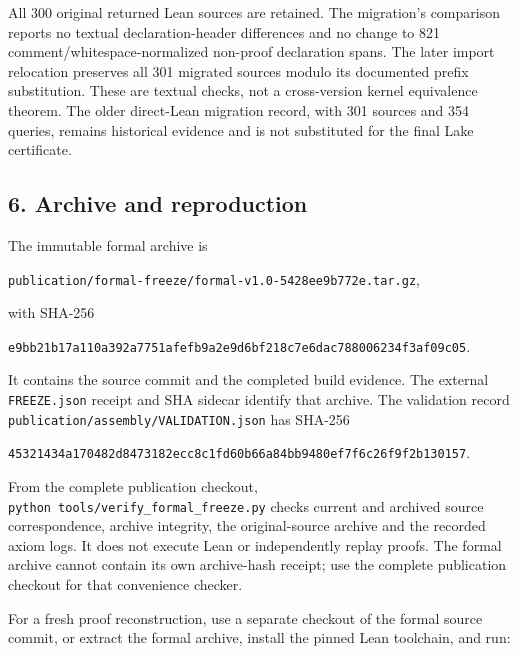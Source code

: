 \documentclass[english,11pt,a4paper]{article}
\begin{document}
All 300 original returned Lean sources are retained. The migration's comparison reports no textual declaration-header differences and no change to 821 comment/whitespace-normalized non-proof declaration spans. The later import relocation preserves all 301 migrated sources modulo its documented prefix substitution. These are textual checks, not a cross-version kernel equivalence theorem. The older direct-Lean migration record, with 301 sources and 354 queries, remains historical evidence and is not substituted for the final Lake certificate.

\subsection{6. Archive and reproduction}\label{archive-and-reproduction}

The immutable formal archive is

\texttt{publication/\allowbreak{}formal-freeze/\allowbreak{}formal-v1.\allowbreak{}0-5428ee9b772e.\allowbreak{}tar.\allowbreak{}gz},

with SHA-256

\texttt{e9bb21b1\allowbreak{}7a110a39\allowbreak{}2a7751af\allowbreak{}efb9a2e9\allowbreak{}d6bf218c\allowbreak{}7e6dac78\allowbreak{}8006234f\allowbreak{}3af09c05}.

It contains the source commit and the completed build evidence. The external \texttt{FREEZE.\allowbreak{}json} receipt and SHA sidecar identify that archive. The validation record \texttt{publication/\allowbreak{}assembly/\allowbreak{}VALIDATION.\allowbreak{}json} has SHA-256

\texttt{45321434\allowbreak{}a170482d\allowbreak{}8473182e\allowbreak{}cc8c1fd6\allowbreak{}0b66a84b\allowbreak{}b9480ef7\allowbreak{}f6c26f9f\allowbreak{}2b130157}.

From the complete publication checkout, \texttt{python\ tools/\allowbreak{}verify\_\allowbreak{}formal\_\allowbreak{}freeze.\allowbreak{}py} checks current and archived source correspondence, archive integrity, the original-source archive and the recorded axiom logs. It does not execute Lean or independently replay proofs. The formal archive cannot contain its own archive-hash receipt; use the complete publication checkout for that convenience checker.

For a fresh proof reconstruction, use a separate checkout of the formal source commit, or extract the formal archive, install the pinned Lean toolchain, and run:
\end{document}
